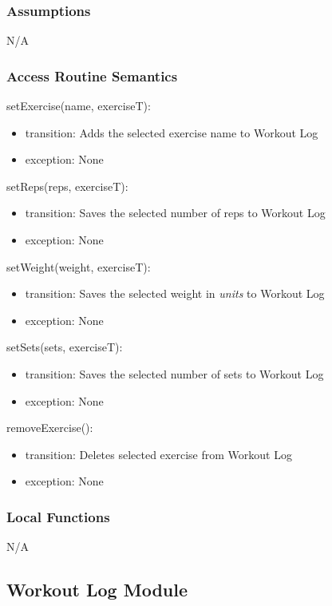 \documentclass[12pt, titlepage]{article}
\begin{document}
\subsubsection{Assumptions}

N/A

\subsubsection{Access Routine Semantics}

\noindent setExercise(name, exerciseT):
\begin{itemize}
	\item transition: Adds the selected exercise name to Workout Log
	\item exception: None
\end{itemize}

\noindent setReps(reps, exerciseT):
\begin{itemize}
	\item transition: Saves the selected number of reps to Workout Log
	\item exception: None
\end{itemize}

\noindent setWeight(weight, exerciseT):
\begin{itemize}
	\item transition: Saves the selected weight in \textit{units} to Workout Log
	\item exception: None
\end{itemize}

\noindent setSets(sets, exerciseT):
\begin{itemize}
	\item transition: Saves the selected number of sets to Workout Log
	\item exception: None
\end{itemize}

\noindent removeExercise():
\begin{itemize}
	\item transition: Deletes selected exercise from Workout Log
	\item exception: None
\end{itemize}

\subsubsection{Local Functions}

N/A


\subsection{Workout Log Module}
\end{document}
